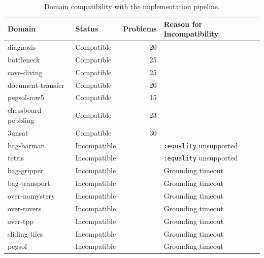 \begin{table}[ht]
    \centering
    \begin{tabular}{llrl}
        \toprule
        \textbf{Domain}     & \textbf{Status} & \textbf{Problems} & \textbf{Reason for Incompatibility} \\
        \midrule
        diagnosis           & Compatible      & 20                &                                     \\
        bottleneck          & Compatible      & 25                &                                     \\
        cave-diving         & Compatible      & 25                &                                     \\
        document-transfer   & Compatible      & 20                &                                     \\
        pegsol-row5         & Compatible      & 15                &                                     \\
        chessboard-pebbling & Compatible      & 23                &                                     \\
        3unsat              & Compatible      & 30                &                                     \\
        \midrule
        bag-barman          & Incompatible    &                   & \texttt{:equality} unsupported      \\
        tetris              & Incompatible    &                   & \texttt{:equality} unsupported      \\
        bag-gripper         & Incompatible    &                   & Grounding timeout                   \\
        bag-transport       & Incompatible    &                   & Grounding timeout                   \\
        over-nomystery      & Incompatible    &                   & Grounding timeout                   \\
        over-rovers         & Incompatible    &                   & Grounding timeout                   \\
        over-tpp            & Incompatible    &                   & Grounding timeout                   \\
        sliding-tiles       & Incompatible    &                   & Grounding timeout                   \\
        pegsol              & Incompatible    &                   & Grounding timeout                   \\
        \bottomrule
    \end{tabular}
    \caption{Domain compatibility with the implementation pipeline.}
    \label{tab:domain_compatibility}
\end{table}


